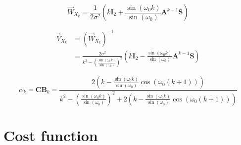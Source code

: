\documentclass[11pt,a4paper,twoside]{report}
\newcommand{\messF}[3]{\overrightarrow{#1}_{{#2}_{k{#3}}}}
\newcommand{\mat}[1]{\mathbf{#1}}
\begin{document}
\begin{equation*}
	\messF{W}{X}{} = \frac{1}{2\sigma^2}\left(k\mat{I}_2 + \frac{\sin{\left(\omega_0k\right)}}{\sin{\left(\omega_0\right)}}\mat{A}^{k-1}\mat{S}\right)
\end{equation*}

\begin{align}
	\messF{V}{X}{} &= \left(\messF{W}{X}{}\right)^{-1} \\
	&= \frac{2\sigma^2}{k^2-\left(\frac{\sin{\left(\omega_0k\right)}}{\sin{\left(\omega_0\right)}}\right)^2}\left(k\mat{I}_2 - \frac{\sin{\left(\omega_0k\right)}}{\sin{\left(\omega_0\right)}}\mat{A}^{k-1}\mat{S}\right)
\end{align}

\begin{equation*}
	\alpha_k = \mat{CB}_k = \frac{2\left(k-\frac{\sin{\left(\omega_0k\right)}}{\sin{\left(\omega_0\right)}}\cos{\left(\omega_0\left(k+1\right)\right)}\right)}{k^2-\left(\frac{\sin{\left(\omega_0k\right)}}{\sin{\left(\omega_0\right)}}\right)^2 + 2\left(k-\frac{\sin{\left(\omega_0k\right)}}{\sin{\left(\omega_0\right)}}\cos{\left(\omega_0\left(k+1\right)\right)}\right)}
\end{equation*}

\chapter*{Cost function}
\cite{SIP}
\clearpage

%

\end{document}
